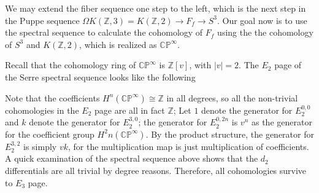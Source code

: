 \documentclass{article}
\theoremstyle{definition}
\theoremstyle{definition}
\theoremstyle{definition}
\theoremstyle{definition}
\theoremstyle{definition}
\theoremstyle{definition}
\begin{document}
We may extend the fiber sequence one step to the left, which is the next step in the Puppe sequence $\Omega K(\mathbb{Z},3)=K(\mathbb{Z},2)\to F_f\to S^3$. Our goal now is to use the spectral sequence to calculate the cohomology of $F_f$ using the the cohomology of $S^3$ and $K(\mathbb{Z},2)$, which is realized as $\mathbb{CP}^{\infty}$. 

Recall that the cohomology ring of $\mathbb{CP}^{\infty}$ is $\mathbb{Z}[v]$, with $|v|=2$. The $E_2$ page of the Serre spectral sequence looks like the following 


Note that the coefficients $H^n(\mathbb{CP}^{\infty})\cong \mathbb{Z}$ in all degrees, so all the non-trivial cohomologies in the $E_2$ page are all in fact $\mathbb{Z}$; Let $1$ denote the generator for $E_2^{0,0}$ and $k$ denote the generator for $E_2^{3,0}$; the generator for $E_2^{0,2n}$ is $v^n$ as the generator for the coefficient group $H^2n(\mathbb{CP}^{\infty})$. By the product structure, the generator for $E_2^{3,2}$ is simply $vk$, for the multiplication map is just multiplication of coefficients.
A quick examination of the spectral sequence above shows that the $d_2$ differentials are all trivial by degree reasons. Therefore, all cohomologies survive to $E_3$ page.
\end{document}
